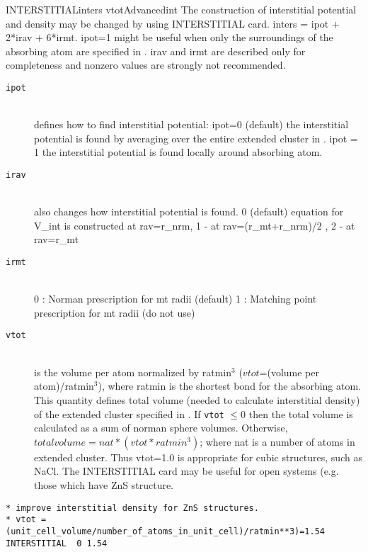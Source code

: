 \documentclass[11pt,oneside]{report} %
\begin{document}
\begin{Card}{INTERSTITIAL}{inters  vtot}{Advanced}{int}
  The construction of interstitial potential and density may be
  changed by using INTERSTITIAL card. inters = ipot + 2*irav + 6*irmt.
  ipot=1 might be useful when only the surroundings of the absorbing
  atom are specified in .  irav and irmt are described only
  for completeness and nonzero values are strongly not recommended.
  \begin{description}
  \item[\texttt{ipot}]\hfill\\ defines how to find interstitial
    potential: ipot=0 (default) the interstitial potential is found by
    averaging over the entire extended cluster in .  ipot = 1
    the interstitial potential is found locally around absorbing atom.
  \item[\texttt{irav}]\hfill\\ also changes how interstitial potential
    is found.  0 (default) equation for V\_int is constructed at
    rav=r\_nrm, 1 - at rav=(r\_mt+r\_nrm)/2 , 2 - at rav=r\_mt
  \item[\texttt{irmt}]\hfill\\ 0 : Norman prescription for mt radii
    (default) 1 : Matching point prescription for mt radii (do not
    use)
  \item[\texttt{vtot}]\hfill\\ is the volume per atom normalized
   by ratmin$^3$ ($vtot$=(volume per atom)/ratmin$^3$),
    where ratmin is the shortest bond for the absorbing atom.
    This quantity defines total volume (needed to
    calculate interstitial density) of the extended cluster specified
    in .  If \texttt{vtot} $\leq0$ then the total volume is
    calculated as a sum of norman sphere volumes. Otherwise,
    $total volume = nat * (vtot*ratmin^3)$;
    where nat is a number of atoms in extended cluster.
    Thus vtot=1.0 is appropriate for cubic structures, such as NaCl.
    The INTERSTITIAL card may be useful for open systems
    (e.g.  those which have ZnS structure.
  \end{description}

\begin{verbatim}
* improve interstitial density for ZnS structures.
* vtot = (unit_cell_volume/number_of_atoms_in_unit_cell)/ratmin**3)=1.54
INTERSTITIAL  0 1.54
\end{verbatim}
\end{Card}
\end{document}
